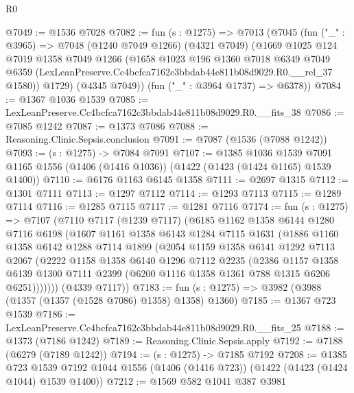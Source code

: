 \begin{lexlean}{R0}
\begin{coremodule}
@7049 := @1536 @7028
@7082 := fun (s : @1275) =>
  @7013
    (@7045
      (fun ("_" : @3965) =>
      @7048
        (@1240 @7049 @1266)
        (@4321 @7049)
        (@1669
          @1025
          @124
          @7019
          @1358
          @7049
          @1266
          (@1658
            @1023
            @196
            @1360
            @7018
            @6349
            @7049
            @6359
            (LexLeanPreserve.Cc4bcfca7162c3bbdab44e811b08d9029.R0.__rel_37 @1580))
          @1729)
        (@4345 @7049))
      (fun ("_" : @3964 @1737) => @6378))
@7084 := @1367 @1036 @1539
@7085 := LexLeanPreserve.Cc4bcfca7162c3bbdab44e811b08d9029.R0.__fits_38
@7086 := @7085 @1242
@7087 := @1373 @7086
@7088 := Reasoning.Clinic.Sepsis.conclusion
@7091 := @7087 (@1536 (@7088 @1242))
@7093 := (s : @1275) -> @7084 @7091
@7107 := @1385
    @1036
    @1539
    @7091
    @1165
    @1556
    (@1406 (@1416 @1036))
    (@1422 (@1423 (@1424 @1165) @1539 @1400))
@7110 := @6176 @1163 @6145 @1358
@7111 := @2697 @1315
@7112 := @1301 @7111
@7113 := @1297 @7112
@7114 := @1293 @7113
@7115 := @1289 @7114
@7116 := @1285 @7115
@7117 := @1281 @7116
@7174 := fun (s : @1275) =>
  @7107
    (@7110
      @7117
      (@1239 @7117)
      (@6185
        @1162
        @1358
        @6144
        @1280
        @7116
        @6198
        (@1607
          @1161
          @1358
          @6143
          @1284
          @7115
          @1631
          (@1886
            @1160
            @1358
            @6142
            @1288
            @7114
            @1899
            (@2054
              @1159
              @1358
              @6141
              @1292
              @7113
              @2067
              (@2222
                @1158
                @1358
                @6140
                @1296
                @7112
                @2235
                (@2386
                  @1157
                  @1358
                  @6139
                  @1300
                  @7111
                  @2399
                  (@6200 @1116 @1358 @1361 @788 @1315 @6206 @6251)))))))
      (@4339 @7117))
@7183 := fun (s : @1275) => @3982 (@3988 (@1357 (@1357 (@1528 @7086) @1358) @1358) @1360)
@7185 := @1367 @723 @1539
@7186 := LexLeanPreserve.Cc4bcfca7162c3bbdab44e811b08d9029.R0.__fits_25
@7188 := @1373 (@7186 @1242)
@7189 := Reasoning.Clinic.Sepsis.apply
@7192 := @7188 (@6279 (@7189 @1242))
@7194 := (s : @1275) -> @7185 @7192
@7208 := @1385
    @723
    @1539
    @7192
    @1044
    @1556
    (@1406 (@1416 @723))
    (@1422 (@1423 (@1424 @1044) @1539 @1400))
@7212 := @1569 @582 @1041 @387 @3981

\end{coremodule}
\end{lexlean}
